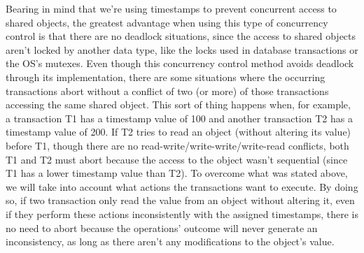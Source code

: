 \documentclass[times, 10pt,twocolumn]{article}
\begin{document}
Bearing in mind that we're using timestamps to prevent concurrent access to shared objects, the greatest advantage when using this type of concurrency control is that there are no deadlock situations, since the access to shared objects aren't locked by another data type, like the locks used in database transactions or the OS's mutexes.
Even though this concurrency control method avoids deadlock through its implementation, there are some situations where the occurring transactions abort without a conflict of two (or more) of those transactions accessing the same shared object. This sort of thing happens when, for example, a transaction T1 has a timestamp value of 100 and another transaction T2 has a timestamp value of 200. If T2 tries to read an object (without altering its value) before T1, though there are no read-write/write-write/write-read conflicts, both T1 and T2 must abort because the access to the object wasn't sequential (since T1 has a lower timestamp value than T2).
To overcome what was stated above, we will take into account what actions the transactions want to execute. By doing so, if two transaction only read the value from an object without altering it, even if they perform these actions inconsistently with the assigned timestamps, there is no need to abort because the operations' outcome will never generate an inconsistency, as long as there aren't any modifications to the object's value.





\end{document}
